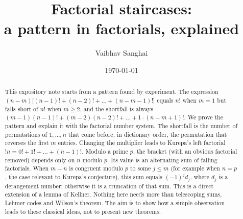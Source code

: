 \documentclass[11pt]{amsart}
\theoremstyle{plain}
\theoremstyle{definition}
\theoremstyle{remark}
\begin{document}

\title[Factorial staircases]{Factorial staircases:\\
a pattern in factorials, explained}
\author{Vaibhav Sanghai}
\date{\today}

\begin{abstract}
This expository note starts from a pattern found by experiment. The expression
$(n-m)\bigl[(n-1)!+(n-2)!+\dots+(n-m-1)!\bigr]$ equals $n!$ when $m=1$ but falls
short of $n!$ when $m\ge2$, and the shortfall is always
$(m-1)(n-1)!+(m-2)(n-2)!+\dots+1\cdot(n-m+1)!$. We prove the pattern and
explain it with the factorial number system. The shortfall is the number of
permutations of $1,\dots,n$ that come before, in dictionary order, the
permutation that reverses the first $m$ entries. Changing the multiplier leads
to Kurepa's left factorial $!n=0!+1!+\dots+(n-1)!$. Modulo a prime $p$, the
bracket (with an obvious factorial removed) depends only on $n$ modulo $p$.
Its value is an alternating sum of falling factorials. When $m-n$ is
congruent modulo $p$ to some $j\le m$ (for example when $n=p$, the case
relevant to Kurepa's conjecture), this sum equals $(-1)^jd_j$, where $d_j$ is a
derangement number; otherwise it is a truncation of that sum. This is a direct extension of a
lemma of Kellner. Nothing here needs more than telescoping sums, Lehmer codes
and Wilson's theorem. The aim is to show how a simple observation leads to
these classical ideas, not to present new theorems.
\end{abstract}

\maketitle

\end{document}

